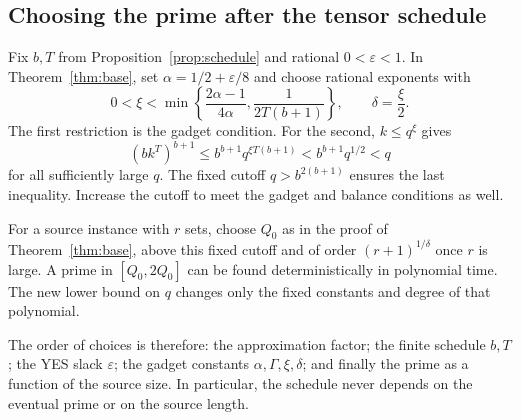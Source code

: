 \documentclass[11pt,letterpaper]{article}
\numberwithin{equation}{section}
\theoremstyle{definition}
\theoremstyle{remark}
\begin{document}
\subsection{Choosing the prime after the tensor schedule}
Fix $b,T$ from Proposition~\ref{prop:schedule} and rational $0<\varepsilon<1$. In Theorem~\ref{thm:base}, set $\alpha=1/2+\varepsilon/8$ and choose rational exponents with
\begin{equation}\label{eq:exponent-choice}
 0<\xi<\min\left\{\frac{2\alpha-1}{4\alpha},\frac1{2T(b+1)}\right\},
 \qquad \delta=\frac\xi2.
\end{equation}
The first restriction is the gadget condition. For the second, $k\le q^\xi$ gives
\begin{equation}\label{eq:prime-bound}
 (bk^T)^{b+1}
 \le b^{b+1}q^{\xi T(b+1)}
 < b^{b+1}q^{1/2}<q
\end{equation}
for all sufficiently large $q$. The fixed cutoff $q>b^{2(b+1)}$ ensures the last inequality. Increase the cutoff to meet the gadget and balance conditions as well.

For a source instance with $r$ sets, choose $Q_0$ as in the proof of Theorem~\ref{thm:base}, above this fixed cutoff and of order $(r+1)^{1/\delta}$ once $r$ is large. A prime in $[Q_0,2Q_0]$ can be found deterministically in polynomial time. The new lower bound on $q$ changes only the fixed constants and degree of that polynomial.

The order of choices is therefore: the approximation factor; the finite schedule $b,T$; the YES slack $\varepsilon$; the gadget constants $\alpha,\Gamma,\xi,\delta$; and finally the prime as a function of the source size. In particular, the schedule never depends on the eventual prime or on the source length.
\end{document}
